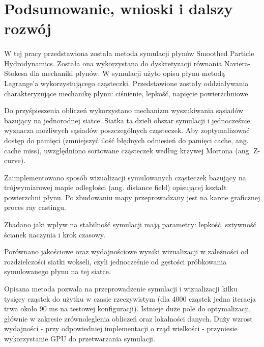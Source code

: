 \newpage

\section{Podsumowanie, wnioski i dalszy rozwój}

\paragraph{}
W tej pracy przedstawiona została metoda symulacji płynów Smoothed Particle Hydrodynamics. Została ona wykorzystana do dyskretyzacji równania Naviera-Stokesa dla mechaniki płynów. W symulacji użyto opisu płynu metodą Lagrange'a wykorzystującego cząsteczki. Przedstawione zostały oddziaływania charakteryzujące mechanikę płynu: ciśnienie, lepkość, napięcie powierzchniowe.
\par
Do przyśpieszenia obliczeń wykorzystano mechanizm wyszukiwania sąsiadów bazujący na jednorodnej siatce. Siatka ta dzieli obszar symulacji i jednocześnie wyznacza możliwych sąsiadów poszczególnych cząsteczek. Aby zoptymalizować dostęp do pamięci (zmniejszyć ilość błędnych odniesień do pamięci cache, ang. cache miss), uwzględniono sortowane cząsteczek według krzywej Mortona (ang. Z-curve).
\par
Zaimplementowano sposób wizualizacji symulowanych cząsteczek bazujący na trójwymiarowej mapie odległości (ang. distance field) opisującej kształt powierzchni płynu. Po zbudowaniu mapy przeprowadzany jest na karcie graficznej proces ray castingu.
\par
Zbadano jaki wpływ na stabilność symulacji mają parametry: lepkość, sztywność ścianek naczynia i krok czasowy.
\par
Porównano jakościowe oraz wydajnościowe wyniki wizualizacji w zależności od rozdzielczości siatki wokseli, czyli jednocześnie od gęstości próbkowania symulowanego płynu na tej siatce.
\par
Opisana metoda pozwala na przeprowadzenie symulacji i wizualizacji kilku tysięcy cząstek do użytku w czasie rzeczywistym (dla 4000 cząstek jedna iteracja trwa około 90 ms na testowej konfiguracji). Istnieje duże pole do optymalizacji, głównie w zakresie zrównoleglenia obliczeń oraz lokalności danych. Duży wzrost wydajności - przy odpowiedniej implementacji o rząd wielkości - przyniesie wykorzystanie GPU do przetwarzania symulacji.
\par